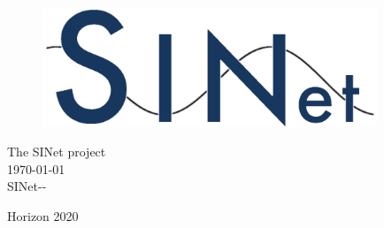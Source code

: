 \label{finalpg}
\clearpage

\thispagestyle{empty}
\begin{center}
\vfill
\begin{figure}
\centering
\vspace{3cm}
  \includegraphics[width=10cm]{images/SINet}
\end{figure}
\vfill
{\large The SINet project\\[0.5cm] }
{\large \today \\[0.5cm] }
{\large SINet-\DelNumber-\DelVersion\\[0.5cm] }
\vfill

Horizon 2020

\doclicenseLicense
\end{center}

